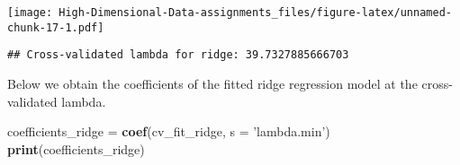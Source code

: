 \documentclass[
]{book}
\newenvironment{Shaded}{\begin{snugshade}}{\end{snugshade}}
\newcommand{\CommentTok}[1]{\textcolor[rgb]{0.56,0.35,0.01}{\textit{#1}}}
\newcommand{\DataTypeTok}[1]{\textcolor[rgb]{0.13,0.29,0.53}{#1}}
\newcommand{\KeywordTok}[1]{\textcolor[rgb]{0.13,0.29,0.53}{\textbf{#1}}}
\newcommand{\NormalTok}[1]{#1}
\newcommand{\OperatorTok}[1]{\textcolor[rgb]{0.81,0.36,0.00}{\textbf{#1}}}
\newcommand{\StringTok}[1]{\textcolor[rgb]{0.31,0.60,0.02}{#1}}
\begin{document}
\texttt{[image: High-Dimensional-Data-assignments\_files/figure-latex/unnamed-chunk-17-1.pdf]}

\begin{Shaded}
\end{Shaded}

\begin{verbatim}
## Cross-validated lambda for ridge: 39.7327885666703
\end{verbatim}

Below we obtain the coefficients of the fitted ridge regression model at the cross-validated lambda.

\begin{Shaded}
\begin{Highlighting}[]
\NormalTok{coefficients_ridge =}\StringTok{ }\KeywordTok{coef}\NormalTok{(cv_fit_ridge, }\DataTypeTok{s =} \StringTok{'lambda.min'}\NormalTok{)}
\KeywordTok{print}\NormalTok{(coefficients_ridge)}
\end{Highlighting}
\end{Shaded}
\end{document}
